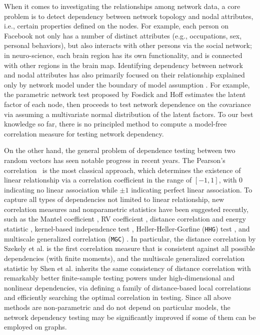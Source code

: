 \documentclass[11pt]{article}
\theoremstyle{definition}
\begin{document}
When it comes to investigating the relationships among network data, a core problem is to detect dependency between network topology and nodal attributes, i.e., certain properties defined on the nodes. For example, each person on Facebook not only has a number of distinct attributes (e.g., occupations, sex, personal behaviors), but also interacts with other persons via the social network; in neuro-science, each brain region has its own functionality, and is connected with other regions in the brain map. Identifying dependency between network and nodal attributes has also primarily focused on their relationship explained only by network model under the boundary of model assumption \cite{wasserman1996logit, howard2016understanding, fosdick2015testing}. For example, the parametric network test proposed by Fosdick and Hoff \cite{fosdick2015testing} estimates the latent factor of each node, then proceeds to test network dependence on the covariance via assuming a multivariate normal distribution of the latent factors. To our best knowledge so far, there is no principled method to compute a model-free correlation measure for testing network dependency. 

On the other hand, the general problem of dependence testing between two random vectors has seen notable progress in recent years. The Pearson's correlation~\cite{Pearson1895} is the most classical approach, which determines the existence of linear relationship via a correlation coefficient in the range of $[-1,1]$, with $0$ indicating no linear association while $\pm 1$ indicating perfect linear association. To capture all types of dependencies not limited to linear relationship, new correlation measures and nonparametric statistics have been suggested recently, such as the Mantel coefficient \cite{mantel1967}, RV coefficient \cite{RobertEscoufier1976}, distance correlation and energy statistic \cite{szekely2007measuring,szekelyRizzo2013a, RizzoSzekely2016}, kernel-based independence test \cite{GrettonGyorfi2010}, Heller-Heller-Gorfine (\texttt{HHG}) test \cite{HellerGorfine2013,heller2016consistent}, and multiscale generalized correlation (\texttt{MGC}) \cite{shen2016discovering}. In particular, the distance correlation by Szekely et al. \cite{szekely2007measuring} is the first correlation measure that is consistent against all possible dependencies (with finite moments), and the multiscale generalized correlation statistic by Shen et al. \cite{shen2016discovering} inherits the same consistency of distance correlation with remarkably better finite-sample testing powers under high-dimensional and nonlinear dependencies, via defining a family of distance-based local correlations and efficiently searching the optimal correlation in testing. Since all above methods are non-parametric and do not depend on particular models, the network dependency testing may be significantly improved if some of them can be employed on graphs.
\end{document}

